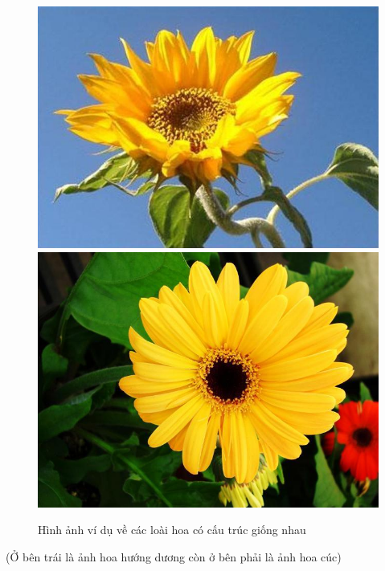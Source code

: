 \documentclass[12pt]{report}
\begin{document}
		\begin{figure}[h]
			\centering
			\includegraphics[scale=0.3]{anh_4}
			\includegraphics[scale=0.3]{anh_3}
			\caption{Hình ảnh ví dụ về các loài hoa có cấu trúc giống nhau}
			\label{fig:anh_1}
		\end{figure}
		(Ở bên trái là ảnh hoa hướng dương còn ở bên phải là ảnh hoa cúc)
																						
\end{document}
